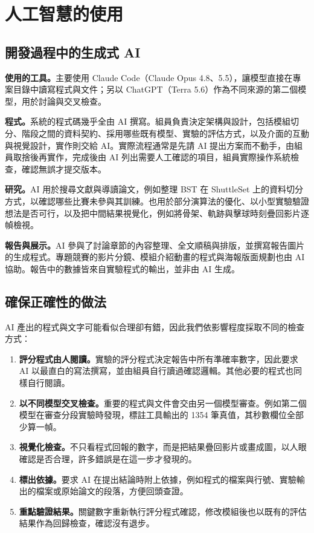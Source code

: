 \chapter{人工智慧的使用}
\label{app:ai-usage}

\section{開發過程中的生成式 AI}

\textbf{使用的工具。}主要使用 Claude Code（Claude Opus 4.8、5.5），讓模型直接在專案目錄中讀寫程式與文件；另以 ChatGPT（Terra 5.6）作為不同來源的第二個模型，用於討論與交叉檢查。

\textbf{程式。}系統的程式碼幾乎全由 AI 撰寫。組員負責決定架構與設計，包括模組切分、階段之間的資料契約、採用哪些既有模型、實驗的評估方式，以及介面的互動與視覺設計，實作則交給 AI。實際流程通常是先請 AI 提出方案而不動手，由組員取捨後再實作，完成後由 AI 列出需要人工確認的項目，組員實際操作系統檢查，確認無誤才提交版本。

\textbf{研究。}AI 用於搜尋文獻與導讀論文，例如整理 BST 在 ShuttleSet 上的資料切分方式，以確認哪些比賽未參與其訓練。也用於部分演算法的優化、以小型實驗驗證想法是否可行，以及把中間結果視覺化，例如將骨架、軌跡與擊球時刻疊回影片逐幀檢視。

\textbf{報告與展示。}AI 參與了討論章節的內容整理、全文順稿與排版，並撰寫報告圖片的生成程式。專題競賽的影片分鏡、模組介紹動畫的程式與海報版面規劃也由 AI 協助。報告中的數據皆來自實驗程式的輸出，並非由 AI 生成。

\section{確保正確性的做法}

AI 產出的程式與文字可能看似合理卻有錯，因此我們依影響程度採取不同的檢查方式：

\begin{enumerate}
  \item \textbf{評分程式由人閱讀。}實驗的評分程式決定報告中所有準確率數字，因此要求 AI 以最直白的寫法撰寫，並由組員自行讀過確認邏輯。其他必要的程式也同樣自行閱讀。
  \item \textbf{以不同模型交叉檢查。}重要的程式與文件會交由另一個模型審查。例如第二個模型在審查分段實驗時發現，標註工具輸出的 1354 筆真值，其秒數欄位全部少算一幀。
  \item \textbf{視覺化檢查。}不只看程式回報的數字，而是把結果疊回影片或畫成圖，以人眼確認是否合理，許多錯誤是在這一步才發現的。
  \item \textbf{標出依據。}要求 AI 在提出結論時附上依據，例如程式的檔案與行號、實驗輸出的檔案或原始論文的段落，方便回頭查證。
  \item \textbf{重點驗證結果。}關鍵數字重新執行評分程式確認，修改模組後也以既有的評估結果作為回歸檢查，確認沒有退步。
\end{enumerate}

